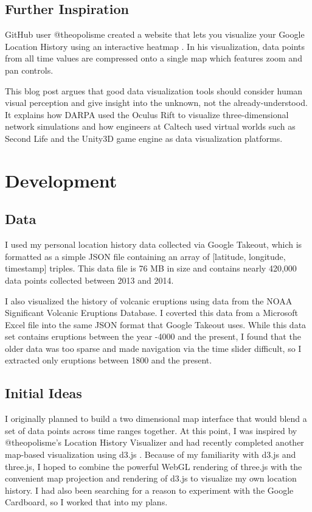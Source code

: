 \documentclass[conference]{acmsiggraph}
\begin{document}
\subsection{Further Inspiration}

GitHub user @theopolisme created a website that lets you visualize your Google
Location History using an interactive heatmap
\cite{location-history-visualizer}. In his visualization, data points from all
time values are compressed onto a single map which features zoom and pan
controls.

This blog post \cite{VR:BigData} argues that good data visualization tools
should consider human visual perception and give insight into the unknown, not
the already-understood. It explains how DARPA used the Oculus Rift to visualize
three-dimensional network simulations and how engineers at Caltech used virtual
worlds such as Second Life and the Unity3D game engine as data visualization
platforms.


\section{Development}

\subsection{Data}

I used my personal location history data collected via Google Takeout, which is
formatted as a simple JSON file containing an array of [latitude, longitude,
timestamp] triples. This data file is 76 MB in size and contains nearly 420,000
data points collected between 2013 and 2014.

I also visualized the history of
volcanic eruptions using data from the NOAA Significant Volcanic Eruptions
Database. I coverted this data from a Microsoft Excel file into the same JSON
format that Google Takeout uses. While this data set contains eruptions between
the year -4000 and the present, I found that the older data was too sparse and
made navigation via the time slider difficult, so I extracted only eruptions
between 1800 and the present.

\subsection{Initial Ideas}

I originally planned to build a two dimensional map interface that would blend
a set of data points across time ranges together. At this point, I was inspired
by @theopolisme's Location History Visualizer and had recently completed another
map-based visualization using d3.js \cite{D3.js}. Because of my familiarity with
d3.js and three.js, I hoped to combine the powerful WebGL rendering of three.js
with the convenient map projection and rendering of d3.js to visualize my own
location history. I had also been searching for a reason to experiment with the
Google Cardboard, so I worked that into my plans.
\end{document}
